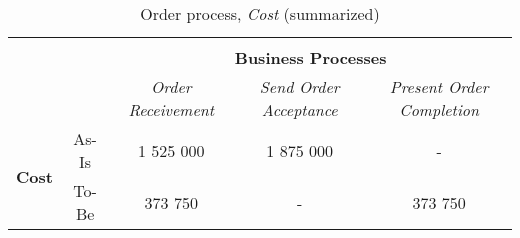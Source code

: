 \begin{table}[H]
\begin{tabular}{|c|c|p{2cm}|p{2.5cm}|p{2.5cm}|p{2.5cm}|}
		\multicolumn{6}{c}{} \\ \cline{3-6}
		\multicolumn{2}{c}{} & \multicolumn{4}{|c|}{\textbf{Business Processes}} \\ \cline{3-6}
		\multicolumn{2}{c|}{} & \multicolumn{1}{c|}{\textsl{Order Receivement}} & \multicolumn{2}{c|}{\textsl{Send Order Acceptance}} & \multicolumn{1}{c|}{\textsl{Present Order Completion}} \\
		\hline
		\multirow{2}{*}{\textbf{Cost}} & As-Is & \multicolumn{1}{c|}{1 525 000} & \multicolumn{2}{c|}{1 875 000} & \multicolumn{1}{c|}{-} \\ \cline{2-6}
		& To-Be & \multicolumn{1}{c|}{373 750} & \multicolumn{2}{c|}{-} & \multicolumn{1}{c|}{373 750} \\ \hline
	\end{tabular}
\caption{Order process, \textsl{Cost} (summarized)} 
\label{tab:order_both}
\end{table}